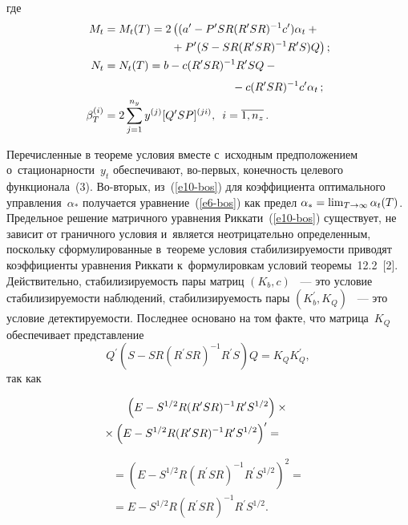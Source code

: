 \begin{multicols}{2}
\vspace*{-3pt}

\noindent
где
\begin{align*}
M_t&=M_t(T)=2\left((a^\prime - P^\prime SR(R^\prime SR)^{-1} c^\prime)\alpha_t+{}\right.\\
&\hspace*{20mm}\left.{}+P^\prime (S-SR(R^\prime SR)^{-1} R^\prime S)Q\right);\\
N_t&=N_t(T) =b-c(R^\prime SR)^{-1} R^\prime SQ -{}\\[3pt]
&\hspace*{40mm}{}-c(R^\prime SR)^{-1} c^\prime \alpha_t\,;\\
\beta_T^{(i)} &=\displaystyle 2\sum\limits_{j=1}^{n_y} y^{(j)} [Q^\prime SP]^{(ji)},\enskip i=\overline{1, n_z}\,.
\end{align*}
     
     Перечисленные в теореме условия вместе с~исходным предположением 
о~ста\-ци\-о\-нар\-ности~$y_t$ обеспечивают, во-пер\-вых, ко\-неч\-ность целевого 
функционала~(3). Во-вто\-рых, из~(\ref{e10-bos}) для коэффициента 
оптимального управ\-ле\-ния~$\alpha_*$ получается уравнение~(\ref{e6-bos}) 
как предел $\alpha_*\hm= \lim_{T\to\infty} \alpha_t(T)$. Предельное решение 
мат\-рич\-но\-го уравнения Риккати~(\ref{e10-bos}) существует, не зависит от 
граничного условия и~является неотрицательно определенным, поскольку 
сформулированные в~тео\-ре\-ме условия ста\-би\-ли\-зи\-ру\-емости приводят 
коэффициенты уравнения Риккати к~формулировкам условий 
тео\-ре\-мы~12.2~[2]. Действительно, ста\-би\-ли\-зи\-ру\-емость пары мат\-риц $(K_b, 
c)$ ~--- это условие ста\-би\-ли\-зи\-ру\-емости наблюдений, ста\-би\-ли\-зи\-ру\-емость 
пары $(K_b^\prime, K_Q)$ ~--- это условие де\-тек\-ти\-ру\-емости. Последнее 
основано на том факте, что мат\-ри\-ца~$K_Q$ обеспечивает пред\-став\-ление 
$$
Q^\prime \left(S- SR\left(R^\prime SR\right)^{-1} R^\prime S\right)Q= K_Q K_Q^\prime,
$$ 
так как

\vspace*{-3pt}

\noindent
     \begin{multline*}
     \left( E-S^{1/2} R(R^\prime SR)^{-1} R^\prime S^{1/2}\right)\times{}\\
     {}\times \left( E-S^{1/2} R(R^\prime SR)^{-1} R^\prime S^{1/2}\right)^\prime={}\hspace*{10mm}
     \end{multline*}
     
     
     \noindent
     \begin{multline*}
     {}=
     \left( E-S^{1/2} R(R^\prime SR)^{-1} R^\prime S^{1/2}\right)^2 ={}\\
     {}=E- S^{1/2} R(R^\prime SR)^{-1} R^\prime S^{1/2}.
     \end{multline*}
     

\end{multicols}
